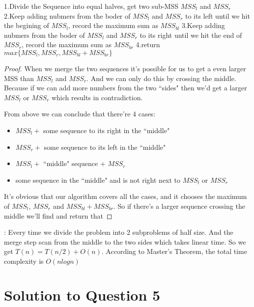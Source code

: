 \documentclass[11pt]{article}
\begin{document}

\begin{algorithm}
\begin{algorithmic}
  \State 1.Divide the Sequence into equal halves, get two sub-MSS $MSS_l$ and $MSS_r$
  \State 2.Keep adding nubmers from the boder of $MSS_l$ and $MSS_r$ to its left until we hit the begining of $MSS_l$, record the maximum sum as $MSS_{bl}$
  \State 3.Keep adding nubmers from the boder of $MSS_l$ and $MSS_r$ to its right until we hit the end of $MSS_r$, record the maximum sum as $MSS_{br}$
  \State 4.return $max\{MSS_l, MSS_r, MSS_{bl}+MSS_{br}\}$
\end{algorithmic}
\end{algorithm}

\begin{proof}
When we merge the two sequences it's possible for us to get a even larger MSS than $MSS_l$ and $MSS_r$. And we can only do this by crossing the middle. Because if we can add more numbers from the two ``sides" then we'd get a larger $MSS_l$ or $MSS_r$ which results in contradiction.

From above we can conclude that there're 4 cases:
\begin{itemize}
\item $MSS_l +$ some sequence to its right in the ``middle"
\item $MSS_r +$ some sequence to its left in the ``middle"
\item $MSS_l +$ ``middle" sequence + $MSS_r$
\item some sequence in the ``middle" and is not right next to $MSS_l$ or $MSS_r$
\end{itemize}

It's obvious that our algorithm covers all the cases, and it chooses the maximum of $MSS_l$, $MSS_r$ and $MSS_{bl}+MSS_{br}$. So if there's a larger sequence crossing the middle we'll find and return that

\end{proof}

: Every time we divide the problem into 2 subproblems of half size. And the merge step scan from the middle to the two sides which takes linear time. So we get $T(n) = T(n/2) + O(n)$. According to Master's Theorem, the total time complexity is $O(nlogn)$

\section{Solution to Question 5}
\end{document}
